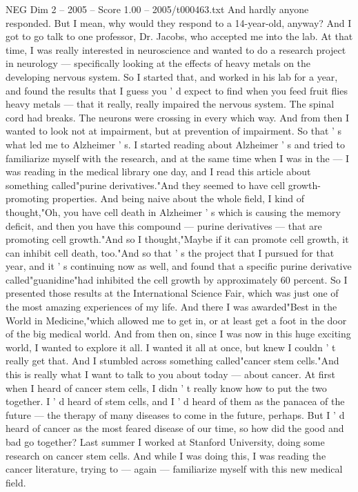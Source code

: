 \begin{textsample}{NEG Dim 2 – 2005 – Score 1.00 – 2005/t000463.txt}
And hardly anyone responded.
But I mean, why would they respond to a 14-year-old, anyway?
And I got to go talk to one professor, Dr.
Jacobs, who accepted me into the lab.
At that time, I was really interested in neuroscience and wanted to do a research project in neurology — specifically looking at the effects of heavy metals on the developing nervous system.
So I started that, and worked in his lab for a year, and found the results that I guess you ' d expect to find when you feed fruit flies heavy metals — that it really, really impaired the nervous system.
The spinal cord had breaks.
The neurons were crossing in every which way.
And from then I wanted to look not at impairment, but at prevention of impairment.
So that ' s what led me to Alzheimer ' s.
I started reading about Alzheimer ' s and tried to familiarize myself with the research, and at the same time when I was in the — I was reading in the medical library one day, and I read this article about something called"purine derivatives."And they seemed to have cell growth-promoting properties.
And being naive about the whole field, I kind of thought,"Oh, you have cell death in Alzheimer ' s which is causing the memory deficit, and then you have this compound — purine derivatives — that are promoting cell growth."And so I thought,"Maybe if it can promote cell growth, it can inhibit cell death, too."And so that ' s the project that I pursued for that year, and it ' s continuing now as well, and found that a specific purine derivative called"guanidine"had inhibited the cell growth by approximately 60 percent.
So I presented those results at the International Science Fair, which was just one of the most amazing experiences of my life.
And there I was awarded"Best in the World in Medicine,"which allowed me to get in, or at least get a foot in the door of the big medical world.
And from then on, since I was now in this huge exciting world, I wanted to explore it all.
I wanted it all at once, but knew I couldn ' t really get that.
And I stumbled across something called"cancer stem cells."And this is really what I want to talk to you about today — about cancer.
At first when I heard of cancer stem cells, I didn ' t really know how to put the two together.
I ' d heard of stem cells, and I ' d heard of them as the panacea of the future — the therapy of many diseases to come in the future, perhaps.
But I ' d heard of cancer as the most feared disease of our time, so how did the good and bad go together?
Last summer I worked at Stanford University, doing some research on cancer stem cells.
And while I was doing this, I was reading the cancer literature, trying to — again — familiarize myself with this new medical field.

\end{textsample}
